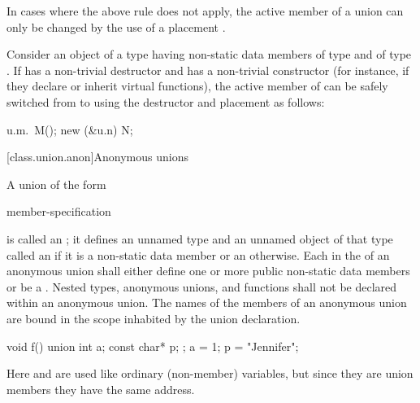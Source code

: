 \pnum
\begin{note}
In cases where the above rule does not apply,
the active member of a union can only be changed by
the use of a placement .
\end{note}
\begin{example}
Consider an object  of a  type  having non-static data members
 of type  and  of type . If  has a non-trivial
destructor and  has a non-trivial constructor (for instance, if they declare or inherit
virtual functions), the active member of  can be safely switched from  to
 using the destructor and placement  as follows:

\begin{codeblock}
u.m.~M();
new (&u.n) N;
\end{codeblock}
\end{example}

[class.union.anon]{Anonymous unions}
%

\pnum
{}%
%
A union of the form
\begin{ncsimplebnf}
 \terminal{\{} member-specification \terminal{\}} \terminal{;}
\end{ncsimplebnf}
is called an ; it defines an unnamed type and
an unnamed object of that type called
an 
if it is a non-static data member or
an  otherwise.
%
%
Each  in the 
of an anonymous union shall either define one or more public non-static data members or
be a .
Nested types, anonymous unions, and functions
shall not be declared within an anonymous union.
The names of the members of an anonymous union
are bound in the scope inhabited by the union declaration.
\begin{example}
\begin{codeblock}
void f() {
  union { int a; const char* p; };
  a = 1;
  p = "Jennifer";
}
\end{codeblock}

Here  and  are used like ordinary (non-member)
variables, but since they are union members they have the same address.
\end{example}

